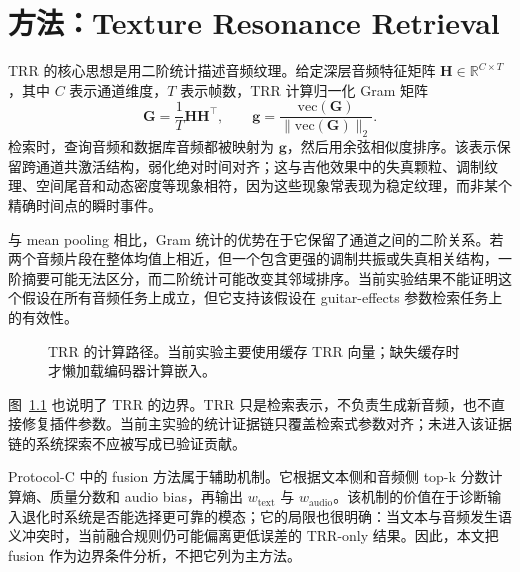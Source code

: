 \chapter{方法：Texture Resonance Retrieval}

TRR 的核心思想是用二阶统计描述音频纹理。给定深层音频特征矩阵 $\mathbf{H}\in\mathbb{R}^{C\times T}$，其中 $C$ 表示通道维度，$T$ 表示帧数，TRR 计算归一化 Gram 矩阵
\[
	\mathbf{G}=\frac{1}{T}\mathbf{H}\mathbf{H}^{\top}, \qquad
	\mathbf{g}=\frac{\mathrm{vec}(\mathbf{G})}{\|\mathrm{vec}(\mathbf{G})\|_2}.
\]
检索时，查询音频和数据库音频都被映射为 $\mathbf{g}$，然后用余弦相似度排序。该表示保留跨通道共激活结构，弱化绝对时间对齐；这与吉他效果中的失真颗粒、调制纹理、空间尾音和动态密度等现象相符，因为这些现象常表现为稳定纹理，而非某个精确时间点的瞬时事件。

与 mean pooling 相比，Gram 统计的优势在于它保留了通道之间的二阶关系。若两个音频片段在整体均值上相近，但一个包含更强的调制共振或失真相关结构，一阶摘要可能无法区分，而二阶统计可能改变其邻域排序。当前实验结果不能证明这个假设在所有音频任务上成立，但它支持该假设在 guitar-effects 参数检索任务上的有效性。

\begin{figure}[H]
	\centering
	\caption{TRR 的计算路径。当前实验主要使用缓存 TRR 向量；缺失缓存时才懒加载编码器计算嵌入。}
	\label{fig:trr-mechanism}
\end{figure}

图~\ref{fig:trr-mechanism} 也说明了 TRR 的边界。TRR 只是检索表示，不负责生成新音频，也不直接修复插件参数。当前主实验的统计证据链只覆盖检索式参数对齐；未进入该证据链的系统探索不应被写成已验证贡献。

Protocol-C 中的 fusion 方法属于辅助机制。它根据文本侧和音频侧 top-k 分数计算熵、质量分数和 audio bias，再输出 $w_{\text{text}}$ 与 $w_{\text{audio}}$。该机制的价值在于诊断输入退化时系统是否能选择更可靠的模态；它的局限也很明确：当文本与音频发生语义冲突时，当前融合规则仍可能偏离更低误差的 TRR-only 结果。因此，本文把 fusion 作为边界条件分析，不把它列为主方法。
